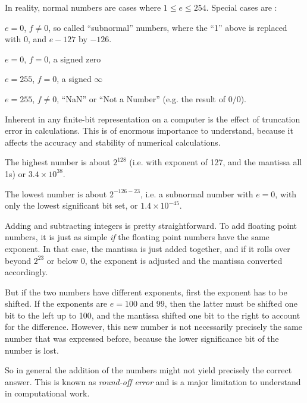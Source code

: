 In reality, normal numbers are cases where $1\le e \le 254$. Special
cases are :
\begin{ditemize}
\item $e=0$, $f\ne 0$, so called ``subnormal'' numbers, where the
  ``1'' above is replaced with 0, and $e-127$ by $-126$.
\item $e=0$, $f=0$, a signed zero
\item $e=255$, $f=0$, a signed $\infty$
\item $e=255$, $f\ne 0$, ``NaN'' or ``Not a Number'' (e.g. the result
  of $0/0$).
\end{ditemize}

Inherent in any finite-bit representation on a computer is the effect
of truncation error in calculations. This is of enormous importance to
understand, because it affects the accuracy and stability of numerical
calculations. 


\begin{answer}
The highest number is about $2^{128}$ (i.e. with exponent of 127, and
the mantissa all 1s) or $3.4\times 10^{38}$. 

The lowest number is about $2^{-126 -23}$, i.e. a subnormal number
with $e=0$, with only the lowest significant bit set, or $1.4\times
10^{-45}$. 
\end{answer}


\begin{answer}
Adding and subtracting integers is pretty straightforward.  To add
floating point numbers, it is just as simple {\it if} the floating
point numbers have the same exponent. In that case, the mantissa is
just added together, and if it rolls over beyond $2^{23}$ or below
$0$, the exponent is adjusted and the mantissa converted accordingly.

But if the two numbers have different exponents, first the exponent
has to be shifted. If the exponents are $e=100$ and $99$, then the
latter must be shifted one bit to the left up to 100, and the mantissa
shifted one bit to the right to account for the difference. However,
this new number is not necessarily precisely the same number that was
expressed before, because the lower significance bit of the number is
lost.

So in general the addition of the numbers might not yield precisely
the correct answer. This is known as {\it round-off error} and is a
major limitation to understand in computational work. 
\end{answer}

